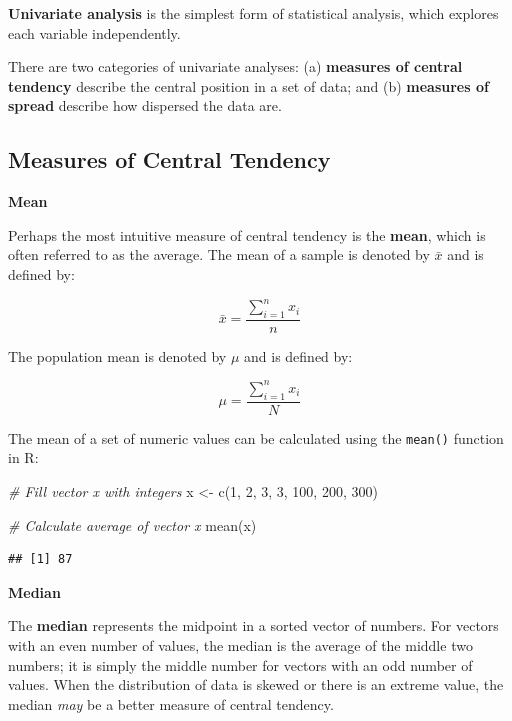 \documentclass[
]{book}
\newenvironment{Shaded}{\begin{snugshade}}{\end{snugshade}}
\newcommand{\CommentTok}[1]{\textcolor[rgb]{0.56,0.35,0.01}{\textit{#1}}}
\newcommand{\DecValTok}[1]{\textcolor[rgb]{0.00,0.00,0.81}{#1}}
\newcommand{\FunctionTok}[1]{\textcolor[rgb]{0.00,0.00,0.00}{#1}}
\newcommand{\NormalTok}[1]{#1}
\newcommand{\OtherTok}[1]{\textcolor[rgb]{0.56,0.35,0.01}{#1}}
\begin{document}
\textbf{Univariate analysis} is the simplest form of statistical analysis, which explores each variable independently.

There are two categories of univariate analyses: (a) \textbf{measures of central tendency} describe the central position in a set of data; and (b) \textbf{measures of spread} describe how dispersed the data are.

\hypertarget{measures-of-central-tendency}{%
\subsection{Measures of Central Tendency}\label{measures-of-central-tendency}}

\textbf{Mean}

Perhaps the most intuitive measure of central tendency is the \textbf{mean}, which is often referred to as the average. The mean of a sample is denoted by \(\bar{x}\) and is defined by:

\[ \bar{x} = \frac{\displaystyle\sum_{i=1}^{n} x_{i}}{n} \]

The population mean is denoted by \(\mu\) and is defined by:

\[ \mu = \frac{\displaystyle\sum_{i=1}^{n} x_{i}}{N} \]

The mean of a set of numeric values can be calculated using the \texttt{mean()} function in R:

\begin{Shaded}
\begin{Highlighting}[]
\CommentTok{\# Fill vector x with integers}
\NormalTok{x }\OtherTok{\textless{}{-}} \FunctionTok{c}\NormalTok{(}\DecValTok{1}\NormalTok{, }\DecValTok{2}\NormalTok{, }\DecValTok{3}\NormalTok{, }\DecValTok{3}\NormalTok{, }\DecValTok{100}\NormalTok{, }\DecValTok{200}\NormalTok{, }\DecValTok{300}\NormalTok{)}

\CommentTok{\# Calculate average of vector x}
\FunctionTok{mean}\NormalTok{(x)}
\end{Highlighting}
\end{Shaded}

\begin{verbatim}
## [1] 87
\end{verbatim}

\textbf{Median}

The \textbf{median} represents the midpoint in a sorted vector of numbers. For vectors with an even number of values, the median is the average of the middle two numbers; it is simply the middle number for vectors with an odd number of values. When the distribution of data is skewed or there is an extreme value, the median \emph{may} be a better measure of central tendency.
\end{document}
